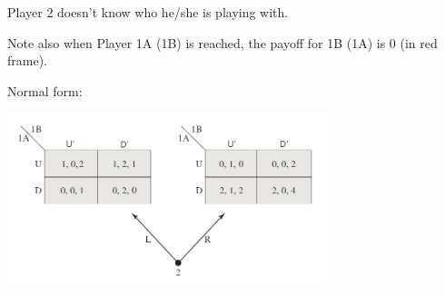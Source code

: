 \documentclass{article}
\begin{document}
\begin{mdframed}[backgroundcolor=blue!20,linecolor=white]
Player 2 doesn't know who he/she is playing with.
\vspace{2mm}

Note also when Player 1A (1B) is reached, the payoff for 1B (1A) is 0 (in red frame).
\end{mdframed}


\vspace{4mm}

Normal form:

\begin{center}
\includegraphics[width=0.7\textwidth]{9.q26_3_b2}
\end{center}
\vspace{2mm}
\end{document}
